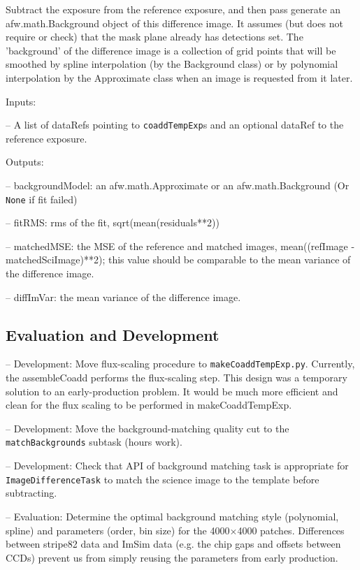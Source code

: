 \documentclass[12pt]{article}
\begin{document}
Subtract the exposure from the reference exposure, and then pass generate an afw.math.Background object of this difference image. It assumes (but does not require or check) that the mask plane already has detections set.  The 'background' of the difference image is a collection of grid points that will be smoothed by spline interpolation (by the Background class)  or by polynomial interpolation by the Approximate class when an image is requested from it later. 

Inputs: 

-- A list of dataRefs  pointing to {\tt coaddTempExp}s and an optional dataRef to the reference exposure. 

Outputs:  

-- backgroundModel: an afw.math.Approximate or an afw.math.Background (Or {\tt None} if fit failed) 

-- fitRMS: rms of the fit, sqrt(mean(residuals**2))

-- matchedMSE: the MSE of the reference and matched images, mean((refImage - matchedSciImage)**2); 
   this value should be comparable to the mean variance of the difference image.

-- diffImVar: the mean variance of the difference image.


\subsection{Evaluation and Development}

-- Development: Move flux-scaling procedure to {\tt makeCoaddTempExp.py}.  Currently, the assembleCoadd performs the flux-scaling step. This design was a temporary solution to an early-production problem.  It would be much more efficient and clean for the flux scaling to be performed in makeCoaddTempExp.

-- Development:  Move the background-matching quality cut to the {\tt matchBackgrounds} subtask (hours work).

-- Development:  Check that API of background matching task is appropriate for {\tt ImageDifferenceTask} to match the science image to the template before subtracting. 

-- Evaluation: Determine the optimal background matching style (polynomial, spline) and parameters (order, bin size) for the 4000$\times$4000 patches. Differences between stripe82 data and ImSim data (e.g. the chip gaps and offsets between CCDs) prevent us from simply reusing the parameters from early production.
\end{document}
